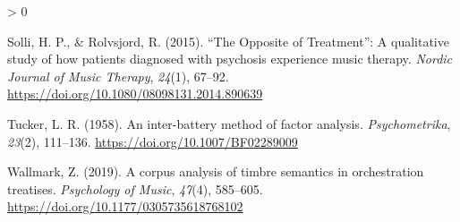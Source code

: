 \documentclass[
  english,
  man]{apa6}
\newlength{\cslhangindent}
\newenvironment{CSLReferences}[2] %
 {%
  \setlength{\parindent}{0pt}
  \ifodd #1 \everypar{\setlength{\hangindent}{\cslhangindent}}\ignorespaces\fi
  \ifnum #2 > 0
  \setlength{\parskip}{#2\baselineskip}
  \fi
 }%
 {}
\begin{document}
\begin{CSLReferences}{1}{0}
\leavevmode\hypertarget{ref-Solli2015}{}%
Solli, H. P., \& Rolvsjord, R. (2015). {{``The Opposite of Treatment''}: A qualitative study of how patients diagnosed with psychosis experience music therapy}. \emph{Nordic Journal of Music Therapy}, \emph{24}(1), 67--92. \url{https://doi.org/10.1080/08098131.2014.890639}

\leavevmode\hypertarget{ref-Tucker1958}{}%
Tucker, L. R. (1958). {An inter-battery method of factor analysis}. \emph{Psychometrika}, \emph{23}(2), 111--136. \url{https://doi.org/10.1007/BF02289009}

\leavevmode\hypertarget{ref-Wallmark2019}{}%
Wallmark, Z. (2019). {A corpus analysis of timbre semantics in orchestration treatises}. \emph{Psychology of Music}, \emph{47}(4), 585--605. \url{https://doi.org/10.1177/0305735618768102}

\end{CSLReferences}

\endgroup
\end{document}
